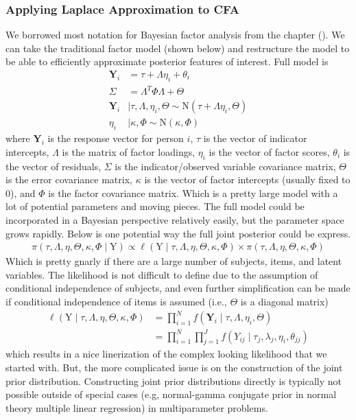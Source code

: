 \documentclass[man, noextraspace, floatsintext, 12pt]{apa7}
\begin{document}
\subsubsection{Applying Laplace Approximation to CFA}

We borrowed most notation for Bayesian factor analysis from the chapter ().
 We can take the traditional factor model (shown below) and restructure the model to be able to efficiently approximate posterior features of interest.
Full model is
\begin{align*}
\mathbf{Y}_i &= \tau + \Lambda \eta_i + \theta_i\\
\Sigma &= \Lambda^T \Phi \Lambda + \Theta\\
\mathbf{Y}_i &\mid \tau, \Lambda, \eta_i, \Theta \sim \mathrm{N}\left(\tau + \Lambda \eta_i, \Theta \right)\\
\eta_i &\mid \kappa, \Phi \sim \mathrm{N}\left(\kappa, \Phi \right)
\end{align*}
where $\mathbf{Y}_i$ is the response vector for person $i$, $\tau$ is the vector of indicator intercepts, $\Lambda$ is the matrix of factor loadings, $\eta_i$ is the vector of factor scores, $\theta_i$ is the vector of residuals, $\Sigma$ is the indicator/observed variable covariance matrix, $\Theta$ is the error covariance matrix, $\kappa$ is the vector of factor intercepts (usually fixed to 0), and $\Phi$ is the factor covariance matrix.
Which is a pretty large model with a lot of potential parameters and moving pieces.
The full model could be incorporated in a Bayesian perspective relatively easily, but the parameter space grows rapidly.
Below is one potential way the full joint posterior could be express.
\begin{align*}
\pi\left(\tau, \Lambda, \eta,\Theta, \kappa, \Phi\mid \mathrm{Y}\right) \propto \ell\left(\mathrm{Y} \mid \tau, \Lambda, \eta,\Theta, \kappa, \Phi\right) \times \pi\left(\tau, \Lambda, \eta,\Theta, \kappa, \Phi\right)
\end{align*}
Which is pretty gnarly if there are a large number of subjects, items, and latent variables.
The likelihood is not difficult to define due to the assumption of conditional independence of subjects, and even further simplification can be made if conditional independence of items is assumed (i.e., $\Theta$ is a diagonal matrix)
\begin{align*}
\ell\left(\mathrm{Y} \mid \tau, \Lambda, \eta,\Theta, \kappa, \Phi\right) &= \prod_{i=1}^{N} f\left(\mathbf{Y}_i \mid \tau, \Lambda, \eta_i, \Theta \right)\\
 &=\prod_{i=1}^{N} \prod_{j=1}^{J}f\left(Y_{ij} \mid \tau_j, \lambda_{j}, \eta_i, \theta_{jj} \right)
\end{align*}
which results in a nice linerization of the complex looking likelihood that we started with.
But, the more complicated issue is on the construction of the joint prior distribution.
Constructing joint prior distributions directly is typically not possible outside of special cases (e.g, normal-gamma conjugate prior in normal theory multiple linear regression) in multiparameter problems.
\end{document}
